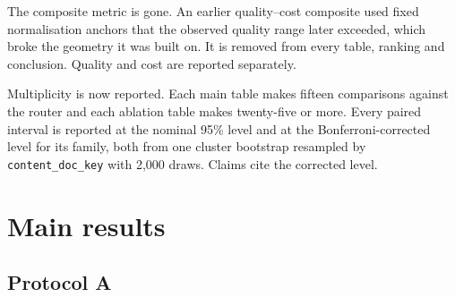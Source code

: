 \documentclass[10pt,a4paper]{article}
\newcommand{\fix}[1]{\textcolor{red!65!black}{#1}}
\begin{document}
\fix{The composite metric is gone.} An earlier quality--cost composite used fixed normalisation
anchors that the observed quality range later exceeded, which broke the geometry it was built on.
It is removed from every table, ranking and conclusion. Quality and cost are reported separately.

\fix{Multiplicity is now reported.} Each main table makes fifteen comparisons against the router
and each ablation table makes twenty-five or more. Every paired interval is reported at the
nominal 95\% level and at the Bonferroni-corrected level for its family, both from one cluster
bootstrap resampled by \texttt{content\_doc\_key} with 2{,}000 draws. Claims cite the corrected
level.

\section{Main results}

\subsection{Protocol A}
\end{document}
